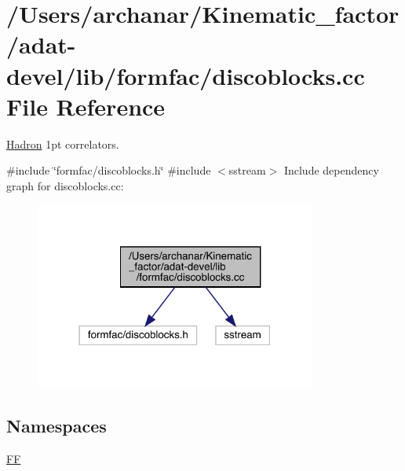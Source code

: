 \hypertarget{adat-devel_2lib_2formfac_2discoblocks_8cc}{}\section{/\+Users/archanar/\+Kinematic\+\_\+factor/adat-\/devel/lib/formfac/discoblocks.cc File Reference}
\label{adat-devel_2lib_2formfac_2discoblocks_8cc}


\mbox{\hyperlink{namespaceHadron}{Hadron}} 1pt correlators.  


{\ttfamily \#include \char`\"{}formfac/discoblocks.\+h\char`\"{}}\newline
{\ttfamily \#include $<$sstream$>$}\newline
Include dependency graph for discoblocks.\+cc\+:
\nopagebreak
\begin{figure}[H]
\begin{center}
\leavevmode
\includegraphics[width=262pt]{db/d53/adat-devel_2lib_2formfac_2discoblocks_8cc__incl}
\end{center}
\end{figure}
\subsection*{Namespaces}
\begin{DoxyCompactItemize}
\item 
 \mbox{\hyperlink{namespaceFF}{FF}}
\end{DoxyCompactItemize}
